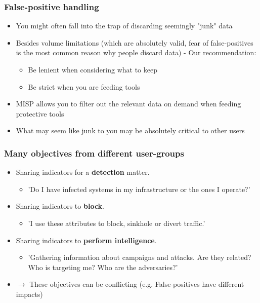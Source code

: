 \begin{frame}
\frametitle{False-positive handling}
\begin{itemize}
	\item You might often fall into the trap of discarding seemingly "junk" data
	\item Besides volume limitations (which are absolutely valid, fear of false-positives is the most common reason why people discard data) - Our recommendation:
	\begin{itemize}
		\item Be lenient when considering what to keep
		\item Be strict when you are feeding tools
	\end{itemize}
	\item MISP allows you to filter out the relevant data on demand when feeding protective tools
	\item What may seem like junk to you may be absolutely critical to other users
\end{itemize}
\end{frame}

\begin{frame}
\frametitle{Many objectives from different user-groups}
        \begin{itemize}
                \item Sharing indicators for a {\bf detection} matter.
                        \begin{itemize}
                                \item 'Do I have infected systems in my infrastructure or the ones I operate?'
                        \end{itemize}
                \item Sharing indicators to {\bf block}.
                        \begin{itemize}
                                \item 'I use these attributes to block, sinkhole or divert traffic.'
                        \end{itemize}
                \item Sharing indicators to {\bf perform intelligence}.
                        \begin{itemize}
                                \item 'Gathering information about campaigns and attacks. Are they related? Who is targeting me? Who are the adversaries?'
                        \end{itemize}
                \item $\rightarrow$ These objectives can be conflicting (e.g. False-positives have different impacts)
        \end{itemize}
\end{frame}

